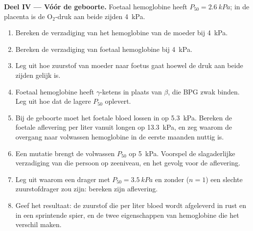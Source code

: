 \begin{problem}
\medskip
\noindent\textbf{Deel IV --- Vóór de geboorte.}
Foetaal hemoglobine heeft $P_{50} = \qty{2.6}{kPa}$; in de placenta is de
$\mathrm{O_2}$-druk aan beide zijden \qty{4}{kPa}.
\begin{enumerate}[resume]
  \item Bereken de verzadiging van het hemoglobine van de moeder bij
        \qty{4}{kPa}.
  \item Bereken de verzadiging van foetaal hemoglobine bij \qty{4}{kPa}.
  \item Leg uit hoe zuurstof van moeder naar foetus gaat hoewel de druk aan
        beide zijden gelijk is.
  \item Foetaal hemoglobine heeft $\gamma$-ketens in plaats van $\beta$,
        die BPG zwak binden. Leg uit hoe dat de lagere $P_{50}$ oplevert.
  \item Bij de geboorte moet het foetale bloed lossen in  op
        \qty{5.3}{kPa}. Bereken de foetale aflevering per liter vanuit
        longen op \qty{13.3}{kPa}, en zeg waarom de overgang naar
        volwassen hemoglobine in de eerste maanden nuttig is.
  \item Een mutatie brengt de volwassen $P_{50}$ op \qty{5}{kPa}. Voorspel
        de slagaderlijke verzadiging van die persoon op zeeniveau, en het
        gevolg voor de aflevering.
  \item Leg uit waarom een drager met $P_{50} = \qty{3.5}{kPa}$ en zonder
         ($n = 1$) een slechte zuurstofdrager zou zijn:
        bereken zijn aflevering.
  \item Geef het resultaat: de zuurstof die per liter bloed wordt
        afgeleverd in rust en in een sprintende spier, en de twee
        eigenschappen van hemoglobine die het verschil maken.
\end{enumerate}
\end{problem}

